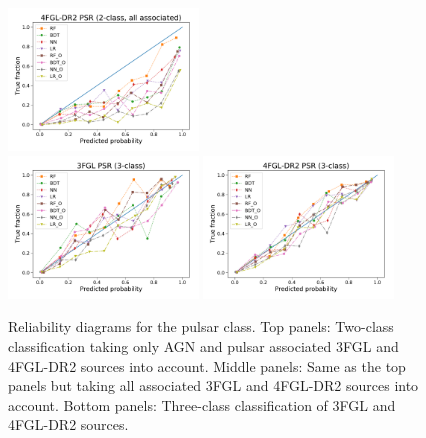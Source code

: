 \documentclass[referee]{aa} %
\begin{document}
\begin{appendix}
\begin{figure}[h!t]
\includegraphics[width=0.45\textwidth]{plots/reliability/calibration_PSR_4FGL-DR2_2classes_all_assoc.pdf} \\ 
\includegraphics[width=0.45\textwidth]{plots/reliability/calibration_PSR_3FGL_3classes.pdf}
\includegraphics[width=0.45\textwidth]{plots/reliability/calibration_PSR_4FGL-DR2_3classes.pdf}
\caption{Reliability diagrams for the pulsar class. Top panels: Two-class classification 
taking only AGN and pulsar associated 3FGL and 4FGL-DR2 sources into account.
Middle panels: Same as the top panels but taking all associated 3FGL and 4FGL-DR2 sources  into account.
Bottom panels: Three-class classification of 3FGL and 4FGL-DR2 sources.
}
\label{fig:rel_PSR}
\end{figure}



\end{appendix}
\end{document}
